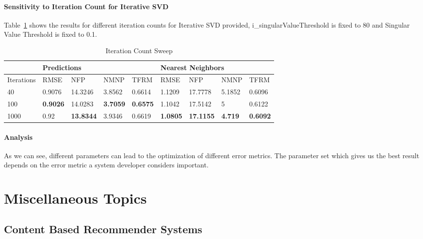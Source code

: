 \paragraph{Sensitivity to Iteration Count for Iterative SVD}
Table~\ref{tab:IterationCountSweep} shows the results for different iteration counts for Iterative SVD provided, i\_singularValueThreshold is fixed to 80 and Singular Value Threshold is fixed to 0.1.
\begin{table}[]
\centering
\caption{Iteration Count Sweep}
\label{tab:IterationCountSweep}
\begin{tabular}{|l|l|l|l|l|l|l|l|l|}
\hline
           & \multicolumn{4}{l|}{Predictions}   & \multicolumn{4}{l|}{Nearest Neighbors} \\ \hline
Iterations & RMSE   & NFP     & NMNP   & TFRM   & RMSE    & NFP      & NMNP    & TFRM    \\ \hline
40         & 0.9076 & 14.3246 & 3.8562 & 0.6614 & 1.1209  & 17.7778  & 5.1852  & 0.6096  \\ \hline
100        & \textbf{0.9026} & 14.0283 & \textbf{3.7059} & \textbf{0.6575} & 1.1042  & 17.5142  & 5       & 0.6122  \\ \hline
1000       & 0.92   & \textbf{13.8344} & 3.9346 & 0.6619 & \textbf{1.0805}  & \textbf{17.1155}  & \textbf{4.719}   & \textbf{0.6092}  \\ \hline
\end{tabular}
\end{table}

\paragraph{Analysis}
As we can see, different parameters can lead to the optimization of different error metrics. The parameter set which gives us the best result depends on the error metric a system developer considers important.

  \section{Miscellaneous Topics}
  \subsection{Content Based Recommender Systems}

